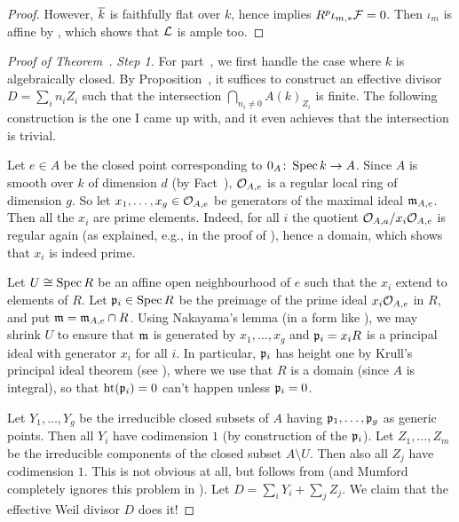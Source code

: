 \documentclass[a4paper,parskip=half,numbers=enddot, DIV=12]{scrreprt}
\begin{document}
\begin{proof}
	However, $\overline{k}$ is faithfully flat over $k$, hence  implies $R^p\iota_{m,*}\mathcal{F}=0$. Then $\iota_m$ is affine by \cite[Proposition~1.6.1]{alggeo2}, which shows that $\mathcal{L}$ is ample too.
\end{proof}
\begin{proof}[Proof of Theorem~]
	 \emph{Step 1.} For part~, we first handle the case where $k$ is algebraically closed. By Proposition~, it suffices to construct an effective divisor $D=\sum_in_iZ_i$ such that the intersection $\bigcap_{n_i\neq 0} A(k)_{Z_i}$ is finite. The following construction is the one I came up with, and it even achieves that the intersection is trivial.
	
	Let $e\in A$ be the closed point corresponding to $0_A\colon \Spec k\morphism A$. Since $A$ is smooth over $k$ of dimension $d$ (by Fact~), $\mathcal{O}_{A,e}$ is a regular local ring of dimension $g$. So let $x_1,\ldots,x_g\in\mathcal{O}_{A,e}$ be generators of the maximal ideal $\mathfrak{m}_{A,e}$. Then all the $x_i$ are prime elements. Indeed, for all $i$ the quotient $\mathcal{O}_{A,a}/x_i\mathcal{O}_{A,e}$ is regular again (as explained, e.g., in the proof of \cite[Proposition~2.2.1]{homalg}), hence a domain, which shows that $x_i$ is indeed prime.
	
	Let $U\cong \operatorname{Spec} R$ be an affine open neighbourhood of $e$ such that the $x_i$ extend to elements of $R$. Let $\mathfrak{p}_i\in \operatorname{Spec} R$ be the preimage of the prime ideal $x_i\mathcal{O}_{A,e}$ in $R$, and put $\mathfrak{m}=\mathfrak{m}_{A,e}\cap R$. Using Nakayama's lemma (in a form like \cite[Lemma~1.5.1]{alg2}), we may shrink $U$ to ensure that $\mathfrak{m}$ is generated by $x_1,\ldots,x_g$ and $\mathfrak{p}_i=x_iR$ is a principal ideal with generator $x_i$ for all $i$. In particular, $\mathfrak{p}_i$ has height one by Krull's principal ideal theorem (see \cite[Theorem~11]{alg2}), where we use that $R$ is a domain (since $A$ is integral), so that $\operatorname{ht}(\mathfrak{p}_i)=0$ can't happen unless $\mathfrak{p}_i=0$. 
	
	Let $Y_1,\ldots,Y_g$ be the irreducible closed subsets of $A$ having $\mathfrak{p}_1,\ldots,\mathfrak{p}_g$ as generic points. Then all $Y_i$ have codimension $1$ (by construction of the $\mathfrak{p}_i$). Let $Z_1,\ldots,Z_m$ be the irreducible components of the closed subset $A\setminus U$. Then also all $Z_j$ have codimension $1$. This is not obvious at all, but follows from \cite[]{stacks-project} (and Mumford completely ignores this problem in \cite[62]{mumford1974abelian}). Let $D=\sum_iY_i+\sum_jZ_j$. We claim that the effective Weil divisor $D$ does it!
	

\end{proof}
\end{document}
